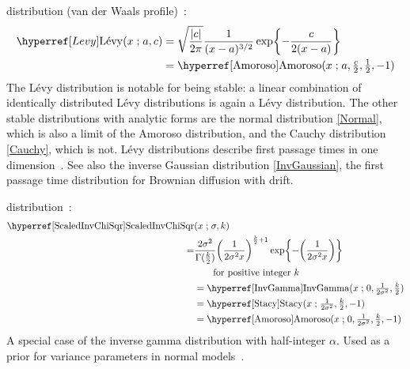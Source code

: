  distribution (van der Waals profile)~\cite{Feller1971}: 
\begin{align}
\label{Levy}
\Levy(x \given a, c) 
&= \sqrt{\frac{|c|}{2\pi}} \frac{1}{(x-a)^{3/2}}  \exp\Left\{-\frac{c}{2(x-a)}\Right\}  \checked
\\
&=  \opr{Amoroso}(x\given  a, \tfrac{c}{2}, \tfrac{1}{2}, -1) \checked \notag 
\end{align}
The L\'{e}vy distribution is notable for being stable:  a linear combination of identically distributed  L\'{e}vy distributions is again a  L\'{e}vy distribution. The other stable distributions with analytic forms are the normal distribution \eqref{Normal}, which is also a limit of the Amoroso distribution, and the Cauchy distribution \eqref{Cauchy}, which is not. L\'{e}vy distributions describe first passage times in one dimension~\cite{Feller1971}. See also the inverse Gaussian distribution \eqref{InvGaussian}, the  first passage time distribution for Brownian diffusion with drift.


  distribution~\cite{Gelman2004}:
\begin{align}
\label{ScaledInvChiSqr}
\opr{ScaledInvChiSqr}&(x \given \sigma, k) 
\\ \notag =& \frac{2 \sigma^2}{\Gamma(\tfrac{k}{2}) } \Left(\frac{1}{2 \sigma^2x}\Right)^{\frac{k}{2}+1} 
\exp\Left\{-\Left( \frac{1}{2 \sigma^2x}   \Right)\Right\} \checked
\\
&\qquad  \text{for positive integer } k \notag \\
&=  \opr{InvGamma}(x\given 0, \tfrac{1}{2 \sigma^2}, \tfrac{k}{2}) \notag  \checked \\
&= \opr{Stacy}(x\given  \tfrac{1}{2 \sigma ^2},\tfrac{k}{2}, -1)  \notag  \checked \\
&=  \opr{Amoroso}(x\given  0, \tfrac{1}{2 \sigma ^2}, \tfrac{k}{2}, -1) \checked \notag 
\end{align}
A special case of the inverse gamma distribution with half-integer $\alpha$. Used as a prior for variance parameters in normal models~\cite{Gelman2004}.




